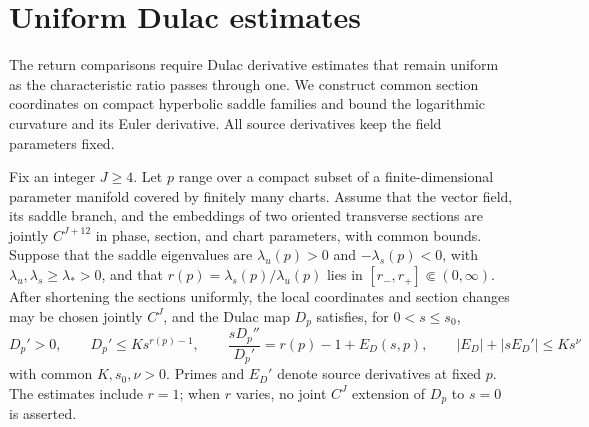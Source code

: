 \section{Uniform Dulac estimates}\label{sec:third-derivatives}
The return comparisons require Dulac derivative estimates that remain
uniform as the characteristic ratio passes through one. We construct
common section coordinates on compact hyperbolic saddle families and
bound the logarithmic curvature and its Euler derivative.
All source derivatives keep the field parameters fixed.

\begin{lemma}\label{lem:dulac-jets}
Fix an integer $J\ge4$. Let $p$ range over a compact subset of a
finite-dimensional parameter manifold covered by finitely many charts.
Assume that the vector field, its saddle branch, and the embeddings of two
oriented transverse sections are jointly $C^{J+12}$ in phase, section, and
chart parameters, with common bounds. Suppose that the saddle eigenvalues
are $\lambda_u(p)>0$ and $-\lambda_s(p)<0$, with
$\lambda_u,\lambda_s\ge\lambda_*>0$, and that
$r(p)=\lambda_s(p)/\lambda_u(p)$ lies in
$[r_-,r_+]\Subset(0,\infty)$. After shortening the sections uniformly, the
local coordinates and section changes may be chosen jointly $C^J$, and the
Dulac map $D_p$ satisfies, for $0<s\le s_0$,
\begin{equation}\label{eq:dulac-third}
 D_p'>0,\qquad D_p'\le Ks^{r(p)-1},\qquad
 \frac{sD_p''}{D_p'}=r(p)-1+E_D(s,p),\qquad
 |E_D|+|sE_D'|\le Ks^\nu
\end{equation}
with common $K,s_0,\nu>0$. Primes and $E_D'$ denote source derivatives at
fixed $p$. The estimates include $r=1$; when $r$ varies, no joint $C^J$
extension of $D_p$ to $s=0$ is asserted.
\end{lemma}
